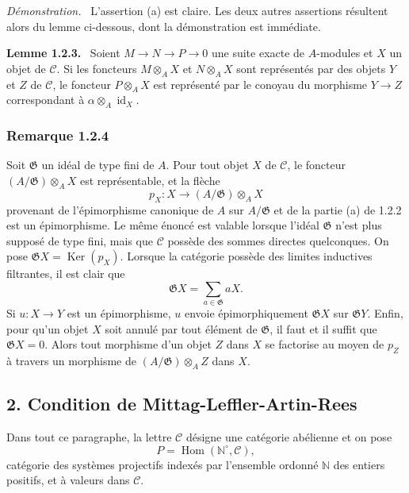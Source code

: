 \documentclass[11pt]{article}
\providecommand{\NN}{\mathbb{N}}
\newenvironment{statement}[1]{\par\medskip\noindent\textbf{#1.}\ }{\par\medskip}
\newenvironment{prooftext}[1][Proof]{\par\noindent\emph{#1.}\ }{\par\medskip}
\DeclareMathOperator{\Hom}{Hom}
\providecommand{\Ker}{\operatorname{Ker}}
\providecommand{\id}{\operatorname{id}}
\providecommand{\Hom}{\operatorname{Hom}}
\providecommand{\NN}{\mathbb N}
\providecommand{\cC}{\mathcal C}
\providecommand{\cG}{\mathfrak G}
\providecommand{\id}{\operatorname{id}}
\providecommand{\Ker}{\operatorname{Ker}}
\providecommand{\Ker}{\operatorname{Ker}}
\providecommand{\id}{\operatorname{id}}
\providecommand{\id}{\operatorname{id}}
\providecommand{\id}{\operatorname{id}}
\providecommand{\cC}{\mathcal C}
\providecommand{\Hom}{\operatorname{Hom}}
\providecommand{\id}{\operatorname{id}}
\begin{document}
\begin{prooftext}[Démonstration]
L'assertion (a) est claire. Les deux autres assertions résultent alors du lemme ci-dessous, dont la démonstration est immédiate.
\end{prooftext}

\begin{statement}{Lemme 1.2.3}
Soient $M\to N\to P\to0$ une suite exacte de $A$-modules et $X$ un objet de $\cC$. Si les foncteurs $M\otimes_A X$ et $N\otimes_A X$ sont représentés par des objets $Y$ et $Z$ de $\cC$, le foncteur $P\otimes_A X$ est représenté par le conoyau du morphisme $Y\to Z$ correspondant à $\alpha\otimes_A\id_X$.
\end{statement}

\subsubsection*{Remarque 1.2.4}
Soit $\cG$ un idéal de type fini de $A$. Pour tout objet $X$ de $\cC$, le foncteur $(A/\cG)\otimes_A X$ est représentable, et la flèche
\[
p_X:X\longrightarrow (A/\cG)\otimes_A X
\]
provenant de l'épimorphisme canonique de $A$ sur $A/\cG$ et de la partie (a) de 1.2.2 est un épimorphisme. Le même énoncé est valable lorsque l'idéal $\cG$ n'est plus supposé de type fini, mais que $\cC$ possède des sommes directes quelconques. On pose $\cG X=\Ker(p_X)$. Lorsque la catégorie possède des limites inductives filtrantes, il est clair que
\[
\cG X=\sum_{a\in\cG}aX.
\]
Si $u:X\to Y$ est un épimorphisme, $u$ envoie épimorphiquement $\cG X$ sur $\cG Y$. Enfin, pour qu'un objet $X$ soit annulé par tout élément de $\cG$, il faut et il suffit que $\cG X=0$. Alors tout morphisme d'un objet $Z$ dans $X$ se factorise au moyen de $p_Z$ à travers un morphisme de $(A/\cG)\otimes_A Z$ dans $X$.

\subsection*{2. Condition de Mittag-Leffler-Artin-Rees}
Dans tout ce paragraphe, la lettre $\cC$ désigne une catégorie abélienne et on pose
\[
P=\Hom(\NN^\circ,\cC),
\]
catégorie des systèmes projectifs indexés par l'ensemble ordonné $\NN$ des entiers positifs, et à valeurs dans $\cC$.
\end{document}
